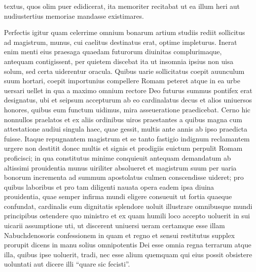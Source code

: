 \documentclass[a5paper,twoside]{article}
\begin{document}
textus, quos olim puer edidicerat, ita memoriter recitabat ut ea illum heri aut nudiustertius memoriae mandasse existimares. 

Perfectis igitur quam celerrime omnium bonarum artium studiis rediit sollicitus ad magistrum, munus, cui caelitus destinatus erat, optime impleturus.  Inerat enim menti eius praesaga quaedam futurorum diuinitas complurimaque, antequam contigissent, per quietem discebat ita ut insomnia ipsius non uisa solum, sed certa uiderentur oracula. Quibus uarie sollicitatus coepit auunculum suum hortari, coepit importunius compellere Romam peteret atque in ea urbe uersari uellet in qua a maximo omnium rectore Deo futurus summus pontifex erat designatus, ubi et seipsum accepturum ab eo cardinalatus decus et alios uniuersos honores, quibus eum functum uidimus, mira asseueratione praedicebat. Cerno hic nonnullos praelatos et ex aliis ordinibus uiros praestantes a quibus magna cum attestatione audiui singula haec, quae gessit, multis ante annis ab ipso praedicta fuisse.  Itaque repugnantem magistrum et se tanto fastigio indignum reclamantem urgere non destitit donec multis et signis et prodigiis euictum perpulit Romam proficisci; in qua constitutus minime conquieuit antequam demandatum ab altissimi prouidentia munus uiriliter absolueret et magistrum suum per uaria bonorum incrementa ad summum apostolatus culmen conscendisse uideret; pro quibus laboribus et pro tam diligenti nauata opera eadem ipsa diuina prouidentia, quae semper infirma mundi eligere consueuit ut fortia quaeque confundat, cardinalis eum dignitatis splendore uoluit illustrare omnibusque mundi principibus ostendere quo ministro et ex quam humili loco accepto uoluerit in sui uicarii assumptione uti, ut discerent uniuersi ueram certamque esse illam Nabuchdenosoris confessionem in quam et regno et sensui restitutus supplex prorupit dicens in manu solius omnipotentis Dei esse omnia regna terrarum atque illa, quibus ipse uoluerit, tradi, nec esse alium quemquam qui eius possit obsistere uoluntati aut dicere illi ``quare sic fecisti''.
\end{document}

